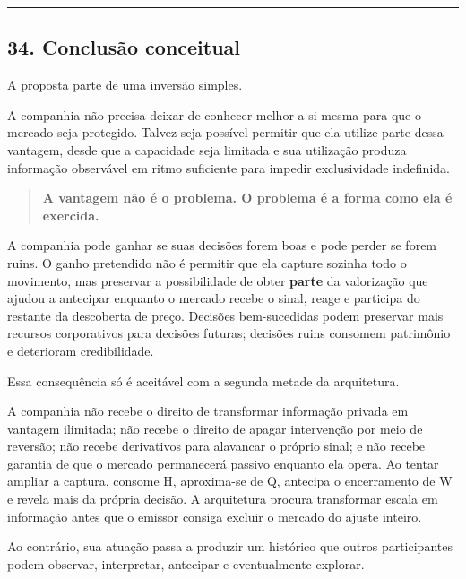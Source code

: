 \documentclass[
  a4paper,
]{article}
\begin{document}
\begin{center}\rule{0.5\linewidth}{0.5pt}\end{center}

\hypertarget{34-conclusao-conceitual}{}

\hypertarget{34-conclusuxe3o-conceitual}{%
\subsection{34. Conclusão conceitual}\label{34-conclusuxe3o-conceitual}}

A proposta parte de uma inversão simples.

A companhia não precisa deixar de conhecer melhor a si mesma para que o
mercado seja protegido. Talvez seja possível permitir que ela utilize
parte dessa vantagem, desde que a capacidade seja limitada e sua
utilização produza informação observável em ritmo suficiente para
impedir exclusividade indefinida.

\begin{quote}
\textbf{A vantagem não é o problema. O problema é a forma como ela é
exercida.}
\end{quote}

A companhia pode ganhar se suas decisões forem boas e pode perder se
forem ruins. O ganho pretendido não é permitir que ela capture sozinha
todo o movimento, mas preservar a possibilidade de obter \textbf{parte}
da valorização que ajudou a antecipar enquanto o mercado recebe o sinal,
reage e participa do restante da descoberta de preço. Decisões
bem-sucedidas podem preservar mais recursos corporativos para decisões
futuras; decisões ruins consomem patrimônio e deterioram credibilidade.

Essa consequência só é aceitável com a segunda metade da arquitetura.

A companhia não recebe o direito de transformar informação privada em
vantagem ilimitada; não recebe o direito de apagar intervenção por meio
de reversão; não recebe derivativos para alavancar o próprio sinal; e
não recebe garantia de que o mercado permanecerá passivo enquanto ela
opera. Ao tentar ampliar a captura, consome H, aproxima-se de Q,
antecipa o encerramento de W e revela mais da própria decisão. A
arquitetura procura transformar escala em informação antes que o emissor
consiga excluir o mercado do ajuste inteiro.

Ao contrário, sua atuação passa a produzir um histórico que outros
participantes podem observar, interpretar, antecipar e eventualmente
explorar.
\end{document}
